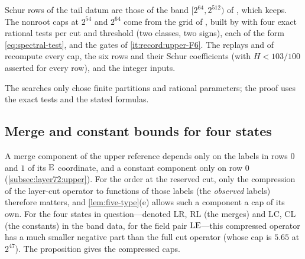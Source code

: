 \begin{certificate}
\begin{enumerate}[label=(\alph*)]
 Schur rows of the tail datum are those of the band $[2^{64},2^{512})$ of
 , which
  keeps. The nonroot
 caps at $2^{54}$ and $2^{64}$ come from the grid  of
 , built by 
 with four exact rational tests per cut and threshold (two classes, two signs),
 each of the form \eqref{eq:spectral-test}, and the gates of
 \ref{it:record:upper-F6}. The replays  and
  of 
 recompute every cap, the six rows and their Schur coefficients (with $H<103/100$
 asserted for every row), and the integer inputs.
\end{enumerate}
The searches only chose finite partitions and rational parameters; the proof uses
the exact tests and the stated formulas.
\end{certificate}

\subsection{Merge and constant bounds for four states}\label{subsec:upper-observed}

A merge component of the upper reference depends only on the
labels in rows $0$ and $1$ of its $\rm E$ coordinate, and a
constant component only on row $0$
(\cref{subsec:layer72:upper}). For the order at the reserved cut,
only the compression of the layer-cut operator to functions of
those labels (the \emph{observed} labels) therefore matters, and
\cref{lem:five-type}(e) allows such a component a cap of its own.
For the four states in question---denoted LR, RL (the merges) and
LC, CL (the constants) in the band data, for the field pair
$\rm LE$---this compressed operator has a much smaller negative
part than the full cut operator (whose cap is $5.65$ at $2^{47}$).
The proposition gives the compressed caps.


